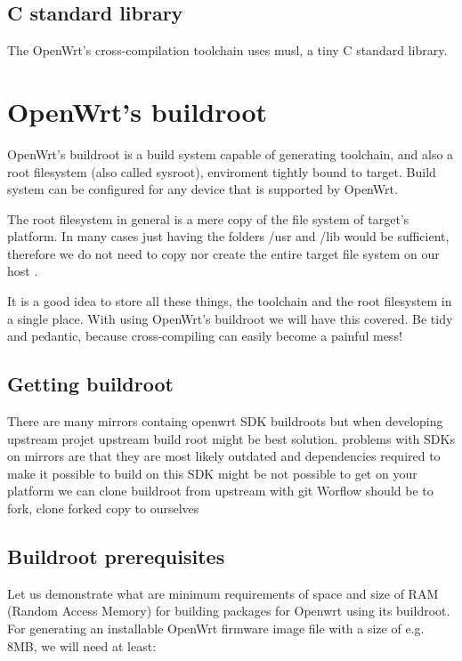\subsection{C standard library}

The OpenWrt's cross-compilation toolchain uses musl, a tiny C standard library.

\section{OpenWrt's buildroot}

OpenWrt's buildroot is a build system capable of generating toolchain, and also a root filesystem (also called sysroot), enviroment tightly bound to target.
Build system can be configured for any device that is supported by OpenWrt.

The root filesystem in general is a mere copy of the file system of target's platform.
In many cases just having the folders /usr and /lib would be sufficient, therefore we do not need to copy nor create the entire target file system on our host .

It is a good idea to store all these things, the toolchain and the root filesystem in a single place.
With using OpenWrt's buildroot we will have this covered.
Be tidy and pedantic, because cross-compiling can easily become a painful mess!

\subsection{Getting buildroot}

There are many mirrors containg openwrt SDK buildroots but when developing upstream projet upstream build root might be best solution.
problems with SDKs on mirrors are that they are most likely outdated and dependencies required to make it possible to build on this SDK might be not possible to get on your platform
we can clone buildroot from upstream with git Worflow should be to fork, clone forked copy to ourselves

\subsection{Buildroot prerequisites}

Let us demonstrate what are minimum requirements of space and size of RAM (Random Access Memory) for building packages for Openwrt using its buildroot.
For generating an installable OpenWrt firmware image file with a size of e.g. 8MB, we will need at least:


